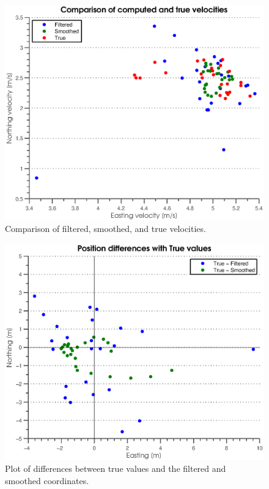 \begin{figure}[htbp]
	\centering
		\includegraphics[width=\MyWidth]{Figures/vDataPlots.eps}
	\caption{Comparison of filtered, smoothed, and true velocities.}
	\label{fig:Figures_vDataPlots}
\end{figure} %


\begin{figure}[h]
	\centering
		\includegraphics[width=\MyWidth]{Figures/diffPlots.eps}
	\caption{Plot of differences between true values and the filtered and smoothed coordinates.}
	\label{fig:Figures_diffPlots}
\end{figure} %
